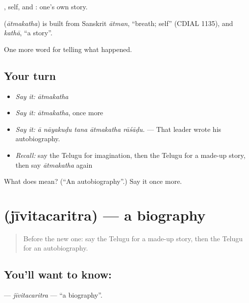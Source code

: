 , self, and : one's own story.

\begin{cousinweb}
\textbf{} (\emph{ātmakatha}) is built from Sanskrit \emph{ātman}, \textquotedblleft{}breath; self\textquotedblright{} (CDIAL 1135), and \emph{kathā}, \textquotedblleft{}a story\textquotedblright{}.
\end{cousinweb}

\begin{grammarlens}[title={What you've built}]
One more word for telling what happened.
\end{grammarlens}

\subsection*{Your turn}
\begin{itemize}
\raggedright
  \item \emph{Say it:} \emph{ātmakatha}
  \item \emph{Say it:} \emph{ātmakatha}, once more
  \item \emph{Say it:} \emph{ā nāyakuḍu tana ātmakatha rāśāḍu.} — That leader wrote his autobiography.
  \item \emph{Recall:} say the Telugu for imagination, then the Telugu for a made-up story, then say \emph{ātmakatha} again
\end{itemize}

\begin{tcolorbox}[breakable,colback=teal!4,colframe=teal!35!black,title={Before you move on}]
What does  mean? (\textquotedblleft{}An autobiography\textquotedblright{}.) Say it once more.
\end{tcolorbox}
\section[\texorpdfstring{\te{జీవితచరిత్ర} (jīvitacaritra)}{జీవితచరిత్ర (jīvitacaritra)}]{ (jīvitacaritra) — a biography}

\label{lesson:TE-C373-jivitacaritra}



\begin{quote}
Before the new one: say the Telugu for a made-up story, then the Telugu for an autobiography.
\end{quote}

\subsection*{You'll want to know: }
\textbf{} — \emph{jīvitacaritra} — \textquotedblleft{}a biography\textquotedblright{}.

